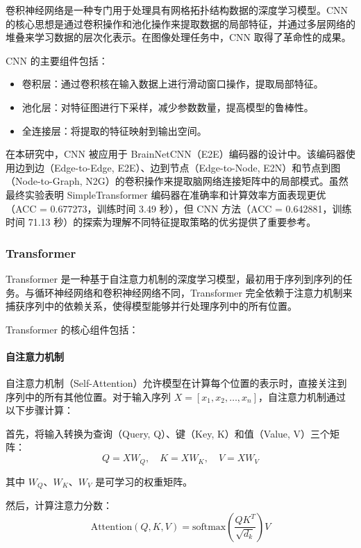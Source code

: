\documentclass[12pt,a4paper]{article}
\begin{document}
卷积神经网络是一种专门用于处理具有网格拓扑结构数据的深度学习模型。CNN 的核心思想是通过卷积操作和池化操作来提取数据的局部特征，并通过多层网络的堆叠来学习数据的层次化表示。在图像处理任务中，CNN 取得了革命性的成果。

CNN 的主要组件包括：
\begin{itemize}
\item 卷积层：通过卷积核在输入数据上进行滑动窗口操作，提取局部特征。
\item 池化层：对特征图进行下采样，减少参数数量，提高模型的鲁棒性。
\item 全连接层：将提取的特征映射到输出空间。
\end{itemize}

在本研究中，CNN 被应用于 BrainNetCNN（E2E）编码器的设计中。该编码器使用边到边（Edge-to-Edge, E2E）、边到节点（Edge-to-Node, E2N）和节点到图（Node-to-Graph, N2G）的卷积操作来提取脑网络连接矩阵中的局部模式。虽然最终实验表明 SimpleTransformer 编码器在准确率和计算效率方面表现更优（ACC = 0.677273，训练时间 3.49 秒），但 CNN 方法（ACC = 0.642881，训练时间 71.13 秒）的探索为理解不同特征提取策略的优劣提供了重要参考。

\subsubsection{Transformer}

Transformer 是一种基于自注意力机制的深度学习模型，最初用于序列到序列的任务\cite{vaswani2017attention}。与循环神经网络和卷积神经网络不同，Transformer 完全依赖于注意力机制来捕获序列中的依赖关系，使得模型能够并行处理序列中的所有位置。

Transformer 的核心组件包括：

\paragraph{自注意力机制}
自注意力机制（Self-Attention）允许模型在计算每个位置的表示时，直接关注到序列中的所有其他位置。对于输入序列 $X = [x_1, x_2, \ldots, x_n]$，自注意力机制通过以下步骤计算：

首先，将输入转换为查询（Query, Q）、键（Key, K）和值（Value, V）三个矩阵：
\begin{equation}
Q = XW_Q, \quad K = XW_K, \quad V = XW_V
\end{equation}

其中 $W_Q$、$W_K$、$W_V$ 是可学习的权重矩阵。

然后，计算注意力分数：
\begin{equation}
\text{Attention}(Q, K, V) = \text{softmax}\left(\frac{QK^T}{\sqrt{d_k}}\right)V
\end{equation}
\end{document}
